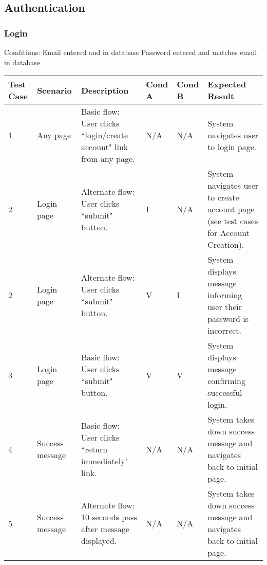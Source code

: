 \begin{landscape}
\clearpage
\subsection{Authentication}
\subsubsection{Login}
\begin{outline}[enumerate]
\1 [] Conditions:
\2 [A] Email entered and in database
\2 [B] Password entered and matches email in database
\end{outline}
\begin{table}[!h]
    \begin{tabular}{|l|p{1in}|p{2.25in}|l|l|p{2.25in}|}
        \hline
        Test Case & Scenario & Description & Cond A & Cond B & Expected Result \\ \hline
        1 & Any page & Basic flow: User clicks ``login/create account" link from any page. & N/A & N/A & System navigates user to login page. \\ \hline
        2 & Login page & Alternate flow: User clicks ``submit" button. & I & N/A & System navigates user to create account page (see test cases for Account Creation). \\ \hline
        2 & Login page & Alternate flow: User clicks ``submit" button. & V & I & System displays message informing user their password is incorrect. \\ \hline
        3 & Login page & Basic flow: User clicks ``submit" button. & V & V & System displays message confirming successful login. \\ \hline
        4 & Success message & Basic flow: User clicks ``return immediately" link. & N/A & N/A & System takes down success message and navigates back to initial page. \\ \hline
        5 & Success message & Alternate flow: 10 seconds pass after message displayed. & N/A & N/A & System takes down success message and navigates back to initial page. \\ \hline
    \end{tabular}
\end{table}


\end{landscape}
